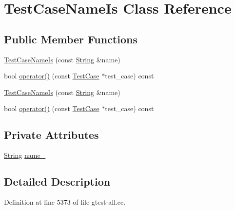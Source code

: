 \hypertarget{classtesting_1_1internal_1_1TestCaseNameIs}{\section{\-Test\-Case\-Name\-Is \-Class \-Reference}
\label{df/d02/classtesting_1_1internal_1_1TestCaseNameIs}
}
\subsection*{\-Public \-Member \-Functions}
\begin{DoxyCompactItemize}
\item 
\hyperlink{classtesting_1_1internal_1_1TestCaseNameIs_af26113c34450ae4e37c0864c2894f30f}{\-Test\-Case\-Name\-Is} (const \hyperlink{classtesting_1_1internal_1_1String}{\-String} \&name)
\item 
bool \hyperlink{classtesting_1_1internal_1_1TestCaseNameIs_abeb26d81f2810a4cd5083d4c32e58629}{operator()} (const \hyperlink{classtesting_1_1TestCase}{\-Test\-Case} $\ast$test\-\_\-case) const 
\item 
\hyperlink{classtesting_1_1internal_1_1TestCaseNameIs_af26113c34450ae4e37c0864c2894f30f}{\-Test\-Case\-Name\-Is} (const \hyperlink{classtesting_1_1internal_1_1String}{\-String} \&name)
\item 
bool \hyperlink{classtesting_1_1internal_1_1TestCaseNameIs_abeb26d81f2810a4cd5083d4c32e58629}{operator()} (const \hyperlink{classtesting_1_1TestCase}{\-Test\-Case} $\ast$test\-\_\-case) const 
\end{DoxyCompactItemize}
\subsection*{\-Private \-Attributes}
\begin{DoxyCompactItemize}
\item 
\hyperlink{classtesting_1_1internal_1_1String}{\-String} \hyperlink{classtesting_1_1internal_1_1TestCaseNameIs_a46d25a1d56b8ab56e84b8bd0c7581e8f}{name\-\_\-}
\end{DoxyCompactItemize}


\subsection{\-Detailed \-Description}


\-Definition at line 5373 of file gtest-\/all.\-cc.



